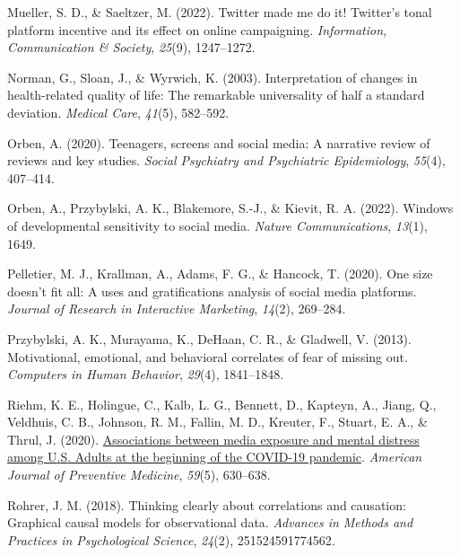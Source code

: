 \documentclass[
  man,mask,floatsintext]{apa7}
\newlength{\cslhangindent}
\newlength{\cslentryspacingunit} %
\newenvironment{CSLReferences}[2] %
 {%
  \setlength{\parindent}{0pt}
  \ifodd #1
  \let\oldpar\par
  \def\par{\hangindent=\cslhangindent\oldpar}
  \fi
  \setlength{\parskip}{#2\cslentryspacingunit}
 }%
 {}
\begin{document}
\begin{CSLReferences}{1}{0}
\leavevmode{}%
Mueller, S. D., \& Saeltzer, M. (2022). Twitter made me do it! {Twitter}'s tonal platform incentive and its effect on online campaigning. \emph{Information, Communication \& Society}, \emph{25}(9), 1247--1272.

\leavevmode{}%
Norman, G., Sloan, J., \& Wyrwich, K. (2003). Interpretation of changes in health-related quality of life: {The} remarkable universality of half a standard deviation. \emph{Medical Care}, \emph{41}(5), 582--592.

\leavevmode{}%
Orben, A. (2020). Teenagers, screens and social media: A narrative review of reviews and key studies. \emph{Social Psychiatry and Psychiatric Epidemiology}, \emph{55}(4), 407--414.

\leavevmode{}%
Orben, A., Przybylski, A. K., Blakemore, S.-J., \& Kievit, R. A. (2022). Windows of developmental sensitivity to social media. \emph{Nature Communications}, \emph{13}(1), 1649.

\leavevmode{}%
Pelletier, M. J., Krallman, A., Adams, F. G., \& Hancock, T. (2020). One size doesn't fit all: A uses and gratifications analysis of social media platforms. \emph{Journal of Research in Interactive Marketing}, \emph{14}(2), 269--284.

\leavevmode{}%
Przybylski, A. K., Murayama, K., DeHaan, C. R., \& Gladwell, V. (2013). Motivational, emotional, and behavioral correlates of fear of missing out. \emph{Computers in Human Behavior}, \emph{29}(4), 1841--1848.

\leavevmode{}%
Riehm, K. E., Holingue, C., Kalb, L. G., Bennett, D., Kapteyn, A., Jiang, Q., Veldhuis, C. B., Johnson, R. M., Fallin, M. D., Kreuter, F., Stuart, E. A., \& Thrul, J. (2020). \href{https://www.ncbi.nlm.nih.gov/pubmed/33011008}{Associations between media exposure and mental distress among {U}.{S}. Adults at the beginning of the {COVID-19} pandemic}. \emph{American Journal of Preventive Medicine}, \emph{59}(5), 630--638.

\leavevmode{}%
Rohrer, J. M. (2018). Thinking clearly about correlations and causation: {Graphical} causal models for observational data. \emph{Advances in Methods and Practices in Psychological Science}, \emph{24}(2), 251524591774562.


\end{CSLReferences}
\end{document}
